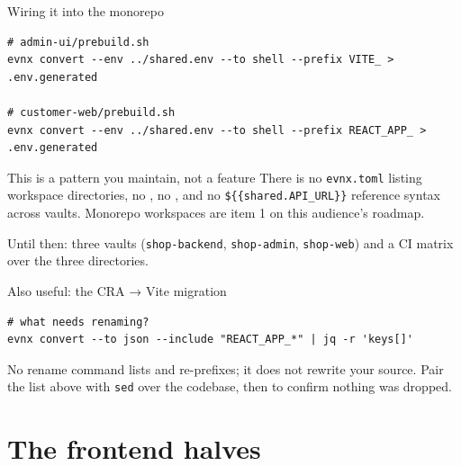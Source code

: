 \documentclass[aspectratio=169,10pt]{beamer}
\begin{document}
\begin{frame}[fragile]{Wiring it into the monorepo}
\begin{lstlisting}[style=evnxcode]
# admin-ui/prebuild.sh
evnx convert --env ../shared.env --to shell --prefix VITE_ > .env.generated

# customer-web/prebuild.sh
evnx convert --env ../shared.env --to shell --prefix REACT_APP_ > .env.generated
\end{lstlisting}

  \vspace{0.7em}
  \begin{trap}{This is a pattern you maintain, not a feature}
    There is no \texttt{evnx.toml} listing workspace directories, no
    , no , and no
    \texttt{\$\{\{shared.API\_URL\}\}} reference syntax across vaults. Monorepo
    workspaces are item 1 on this audience's roadmap.
  \end{trap}

  \vspace{0.4em}
  {\footnotesize Until then: three vaults (\texttt{shop-backend},
  \texttt{shop-admin}, \texttt{shop-web}) and a CI matrix over the three
  directories.}
\end{frame}

\begin{frame}[fragile]{Also useful: the CRA → Vite migration}
\begin{lstlisting}[style=evnxcode]
# what needs renaming?
evnx convert --to json --include "REACT_APP_*" | jq -r 'keys[]'
\end{lstlisting}

  \vspace{0.7em}
  \begin{block}{No rename command}
     lists and re-prefixes; it does not rewrite your source. Pair
    the list above with \texttt{sed} over the codebase, then
     to confirm nothing was dropped.
  \end{block}
\end{frame}

\section{The frontend halves}
\end{document}
